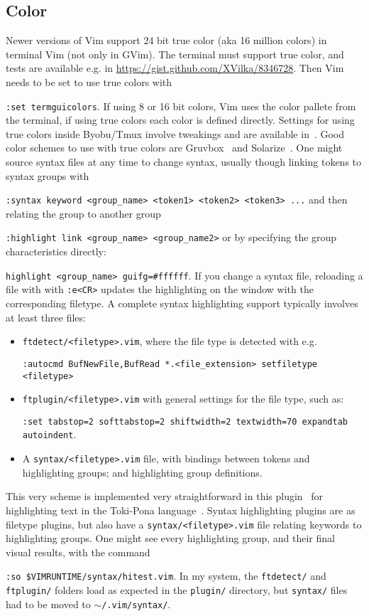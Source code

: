\documentclass{article}
\newcommand{\tttt}[1] {
	\texttt{#1}}
\begin{document}
\subsection{Color}\label{visual2}
Newer versions of Vim support 24 bit true color (aka 16 million colors)
in terminal Vim (not only in GVim).
The terminal must support true color, and tests are available e.g. in
\url{https://gist.github.com/XVilka/8346728}.
Then Vim needs to be set to use true colors with
\tttt{:set termguicolors}.
If using 8 or 16 bit colors, Vim uses the color pallete from the
terminal, if using true colors each color is defined directly.
Settings for using true colors inside Byobu/Tmux involve tweakings
and are available in~\cite{vimrc}.
Good color schemes to use with true colors are Gruvbox~\cite{gruv}
and Solarize~\cite{sol}.
One might source syntax files at any time to change syntax, usually
though linking tokens to syntax groups with
\tttt{:syntax keyword <group\_name> <token1> <token2> <token3> ...}
and then relating the group to another group 
\tttt{:highlight link <group\_name> <group\_name2>}
or by specifying the group characteristics directly:
\tttt{highlight <group\_name> guifg=\#ffffff}.
If you change a syntax file, reloading a file with with \tttt{:e<CR>}
updates the highlighting on the window with the corresponding filetype.
A complete syntax highlighting support typically involves at least three files:
\begin{itemize}
  \item \tttt{ftdetect/<filetype>.vim}, where the file type is
    detected with e.g.
    \tttt{:autocmd BufNewFile,BufRead *.<file\_extension> setfiletype <filetype>}
  \item \tttt{ftplugin/<filetype>.vim} with general settings for the
    file type, such as: 
    \tttt{:set tabstop=2 softtabstop=2 shiftwidth=2 textwidth=70
    expandtab autoindent}.
  \item A \tttt{syntax/<filetype>.vim} file, with bindings between
    tokens and highlighting groups; and highlighting group definitions.
\end{itemize}

This very scheme is implemented very straightforward in this
plugin~\cite{tokipona}
for highlighting text in the Toki-Pona language~\cite{tpLang}.
Syntax highlighting plugins are as filetype plugins,
but also have a \tttt{syntax/<filetype>.vim} file
relating keywords to highlighting groups. 
One might see every highlighting group, and their final visual results,
with the command
\tttt{:so \$VIMRUNTIME/syntax/hitest.vim}.
In my system, the \tttt{ftdetect/} and \tttt{ftplugin/} folders load as expected in the \tttt{plugin/}
directory, but \tttt{syntax/} files had to be moved to \tttt{$\sim$/.vim/syntax/}.
\end{document}
